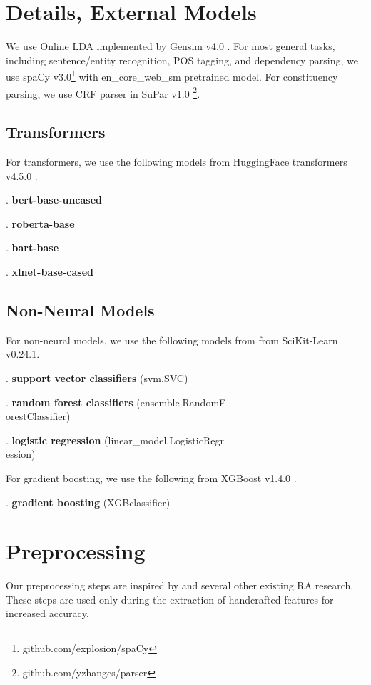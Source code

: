 \documentclass[11pt]{article}
\begin{document}
\section{Details, External Models}
We use Online LDA implemented by Gensim v4.0 \citep{rehurek_lrec}. For most general tasks, including sentence/entity recognition, POS tagging, and dependency parsing, we use spaCy v3.0\footnote{github.com/explosion/spaCy} \citep{spacy} with en\_core\_web\_sm pretrained model. For constituency parsing, we use CRF parser \citep{zhang-etal-2020-fast} in SuPar v1.0 \footnote{github.com/yzhangcs/parser}. 

\subsection{Transformers}
\noindent
For transformers, we use the following models from HuggingFace transformers v4.5.0 \citep{wolf-etal-2020-transformers}.

. \textbf{bert-base-uncased}

. \textbf{roberta-base}

. \textbf{bart-base}

. \textbf{xlnet-base-cased} 

\subsection{Non-Neural Models}
\noindent
For non-neural models, we use the following models from from SciKit-Learn v0.24.1.

. \textbf{support vector classifiers} (svm.SVC) \citep{10.1109/5254.708428, Platt99probabilisticoutputs,chang2011libsvm}

. \textbf{random forest classifiers} (ensemble.RandomF\\orestClassifier) \citep{breiman2001random}

. \textbf{logistic regression} (linear\_model.LogisticRegr\\ession) 

For gradient boosting, we use the following from XGBoost v1.4.0 \citep{chen2016xgboost}.

. \textbf{gradient boosting} (XGBclassifier)

\section{Preprocessing}
Our preprocessing steps are inspired by \citet{Martinc:21} and several other existing RA research. These steps are used only during the extraction of handcrafted features for increased accuracy. 
\end{document}
